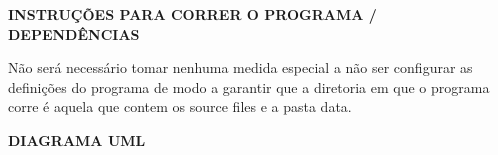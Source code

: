 {\bfseries{INSTRUÇÕ\+ES PARA CORRER O PROGRAMA / DEPENDÊ\+NCIAS}}

Não será necessário tomar nenhuma medida especial a não ser configurar as definições do programa de modo a garantir que a diretoria em que o programa corre é aquela que contem os source files e a pasta data.

{\bfseries{DIAGRAMA UML}}

 